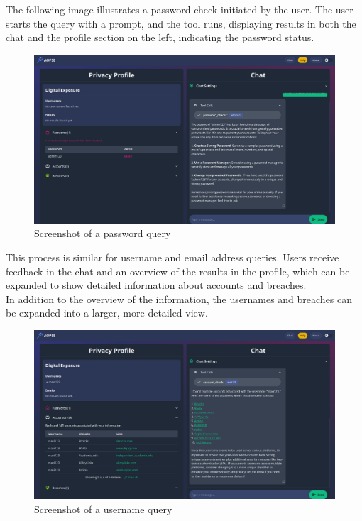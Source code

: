 \documentclass[
    a4paper,
    pagesize,
	pdftex,
    12pt,
]{scrartcl}
\begin{document}
The following image illustrates a password check initiated by the user. The user starts the query with a prompt, and the tool runs, displaying results in both the chat and the profile section on the left, indicating the password status.
\begin{figure}[H]
	\centering
	\includegraphics[width=15cm]{Frontend-password-check.png}
	\caption{Screenshot of a password query}
	\label{fig:frondent-password-check}
\end{figure}
This process is similar for username and email address queries. Users receive feedback in the chat and an overview of the results in the profile, which can be expanded to show detailed information about accounts and breaches. \\
In addition to the overview of the information, the usernames and breaches can be expanded into a larger, more detailed view.
\begin{figure}[H]
	\centering
	\includegraphics[width=15cm]{Frontend-username.png}
	\caption{Screenshot of a username query}
	\label{fig:frondent-username}
\end{figure}
\end{document}
